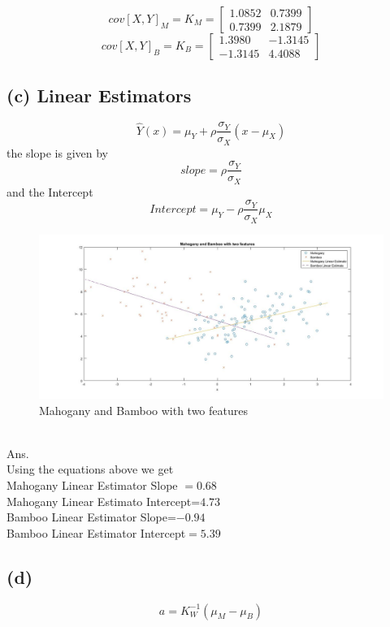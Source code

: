 \documentclass[a4paper,11pt]{article}
\begin{document}
    \[
cov[X,Y]_M = K_M =
  \begin{bmatrix}
    1.0852 & 0.7399  \\
     0.7399 &2.1879 
  \end{bmatrix}
\]
    \[
cov[X,Y]_B = K_B =
  \begin{bmatrix}
    1.3980 & -1.3145  \\
     -1.3145 &4.4088
  \end{bmatrix}
\]
\newpage
\clearpage
\subsection*{(c) Linear Estimators}
$$\hat{Y}(x) = \mu_Y+\rho\frac{\sigma_Y}{\sigma_X}(x-\mu_X)$$
the slope is given by 
$$slope = \rho \frac{\sigma_Y}{\sigma_X}$$
and the Intercept 
$$Intercept = \mu_Y - \rho \frac{\sigma_Y}{\sigma_X}\mu_X$$
\begin{figure}[h]
  \hspace*{-6cm}
   \includegraphics[scale=0.5]{q1_c}
   \caption{Mahogany and Bamboo with two features}\label{fig:q1_c}
\end{figure}
\clearpage
\newpage
\quad \\
Ans.\\
Using the equations above we get\\
Mahogany Linear Estimator Slope $=  0.68$\\
Mahogany Linear Estimato  Intercept=$4.73$ \\
Bamboo Linear Estimator Slope=$-0.94$\\ 
Bamboo Linear Estimator Intercept$=5.39$ \\
\subsection*{(d)}
$$a = K_W^{-1}(\mu_M-\mu_B)$$
\end{document}
